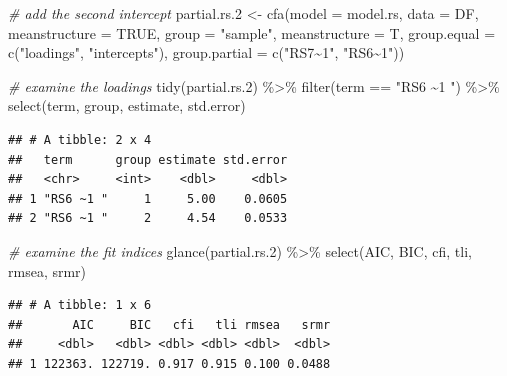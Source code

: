 \documentclass[
  man]{apa7}
\newenvironment{Shaded}{\begin{snugshade}}{\end{snugshade}}
\newcommand{\AttributeTok}[1]{\textcolor[rgb]{0.77,0.63,0.00}{#1}}
\newcommand{\CommentTok}[1]{\textcolor[rgb]{0.56,0.35,0.01}{\textit{#1}}}
\newcommand{\ConstantTok}[1]{\textcolor[rgb]{0.00,0.00,0.00}{#1}}
\newcommand{\FloatTok}[1]{\textcolor[rgb]{0.00,0.00,0.81}{#1}}
\newcommand{\FunctionTok}[1]{\textcolor[rgb]{0.00,0.00,0.00}{#1}}
\newcommand{\NormalTok}[1]{#1}
\newcommand{\OtherTok}[1]{\textcolor[rgb]{0.56,0.35,0.01}{#1}}
\newcommand{\SpecialCharTok}[1]{\textcolor[rgb]{0.00,0.00,0.00}{#1}}
\newcommand{\StringTok}[1]{\textcolor[rgb]{0.31,0.60,0.02}{#1}}
\begin{document}
\small

\begin{Shaded}
\begin{Highlighting}[]
\CommentTok{\# add the second intercept}
\NormalTok{partial.rs}\FloatTok{.2} \OtherTok{\textless{}{-}} \FunctionTok{cfa}\NormalTok{(}\AttributeTok{model =}\NormalTok{ model.rs, }
                  \AttributeTok{data =}\NormalTok{ DF, }
                  \AttributeTok{meanstructure =} \ConstantTok{TRUE}\NormalTok{,}
                  \AttributeTok{group =} \StringTok{"sample"}\NormalTok{, }
                  \AttributeTok{meanstructure =}\NormalTok{ T, }
                  \AttributeTok{group.equal =} \FunctionTok{c}\NormalTok{(}\StringTok{"loadings"}\NormalTok{, }\StringTok{"intercepts"}\NormalTok{),}
                  \AttributeTok{group.partial =} \FunctionTok{c}\NormalTok{(}\StringTok{"RS7\textasciitilde{}1"}\NormalTok{, }\StringTok{"RS6\textasciitilde{}1"}\NormalTok{))}

\CommentTok{\# examine the loadings }
\FunctionTok{tidy}\NormalTok{(partial.rs}\FloatTok{.2}\NormalTok{) }\SpecialCharTok{\%\textgreater{}\%} 
  \FunctionTok{filter}\NormalTok{(term }\SpecialCharTok{==} \StringTok{"RS6 \textasciitilde{}1 "}\NormalTok{) }\SpecialCharTok{\%\textgreater{}\%} 
  \FunctionTok{select}\NormalTok{(term, group, estimate, std.error)}
\end{Highlighting}
\end{Shaded}

\normalsize

\begin{verbatim}
## # A tibble: 2 x 4
##   term      group estimate std.error
##   <chr>     <int>    <dbl>     <dbl>
## 1 "RS6 ~1 "     1     5.00    0.0605
## 2 "RS6 ~1 "     2     4.54    0.0533
\end{verbatim}

\small

\begin{Shaded}
\begin{Highlighting}[]
\CommentTok{\# examine the fit indices }
\FunctionTok{glance}\NormalTok{(partial.rs}\FloatTok{.2}\NormalTok{) }\SpecialCharTok{\%\textgreater{}\%} 
  \FunctionTok{select}\NormalTok{(AIC, BIC, cfi, tli, rmsea, srmr)}
\end{Highlighting}
\end{Shaded}

\normalsize

\begin{verbatim}
## # A tibble: 1 x 6
##       AIC     BIC   cfi   tli rmsea   srmr
##     <dbl>   <dbl> <dbl> <dbl> <dbl>  <dbl>
## 1 122363. 122719. 0.917 0.915 0.100 0.0488
\end{verbatim}
\end{document}
